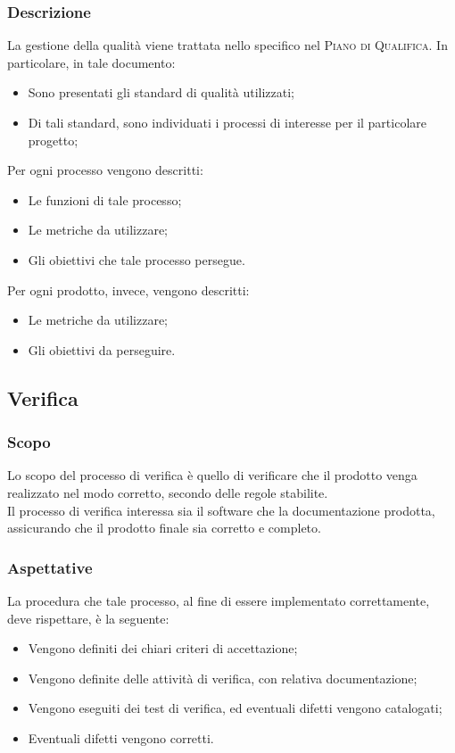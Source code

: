 \documentclass[../norme-di-progetto.tex]{subfiles}
\begin{document}
\subsubsection{Descrizione}
La gestione della qualità viene trattata nello specifico nel \textsc{Piano di Qualifica}. In particolare, in tale documento:
\begin{itemize}
  \item Sono presentati gli standard di qualità utilizzati;
  \item Di tali standard, sono individuati i processi di interesse per il particolare progetto;
\end{itemize}
Per ogni processo vengono descritti:
\begin{itemize}
  \item Le funzioni di tale processo;
  \item Le metriche da utilizzare;
  \item Gli obiettivi che tale processo persegue.
\end{itemize}
Per ogni prodotto, invece, vengono descritti:
\begin{itemize}
  \item Le metriche da utilizzare;
  \item Gli obiettivi da perseguire.
\end{itemize}

\subsection{Verifica}

\subsubsection{Scopo}
Lo scopo del processo di verifica è quello di verificare che il prodotto venga realizzato nel modo corretto, secondo delle regole stabilite. \\
Il processo di verifica interessa sia il software che la documentazione prodotta, assicurando che il prodotto finale sia corretto e completo.

\subsubsection{Aspettative}
La procedura che tale processo, al fine di essere implementato correttamente, deve rispettare, è la seguente:
\begin{itemize}
  \item Vengono definiti dei chiari criteri di accettazione;
  \item Vengono definite delle attività di verifica, con relativa documentazione;
  \item Vengono eseguiti dei test di verifica, ed eventuali difetti vengono catalogati;
  \item Eventuali difetti vengono corretti.
\end{itemize}
\end{document}
